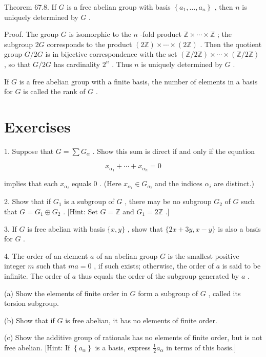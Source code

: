 \documentclass[10pt]{article}
\begin{document}
Theorem 67.8. If \(G\) is a free abelian group with basis \(\left\{  {{a}_{1},\ldots ,{a}_{n}}\right\}\) , then \(n\) is uniquely determined by \(G\) .

Proof. The group \(G\) is isomorphic to the \(n\) -fold product \(\mathbb{Z} \times  \cdots  \times  \mathbb{Z}\) ; the subgroup \({2G}\) corresponds to the product \(\left( {2\mathbb{Z}}\right)  \times  \cdots  \times  \left( {2\mathbb{Z}}\right)\) . Then the quotient group \(G/{2G}\) is in bijective correspondence with the set \(\left( {\mathbb{Z}/2\mathbb{Z}}\right)  \times  \cdots  \times  \left( {\mathbb{Z}/2\mathbb{Z}}\right)\) , so that \(G/{2G}\) has cardinality \({2}^{n}\) . Thus \(n\) is uniquely determined by \(G\) .

If \(G\) is a free abelian group with a finite basis, the number of elements in a basis for \(G\) is called the rank of \(G\) .

\section*{Exercises}

1. Suppose that \(G = \sum {G}_{\alpha }\) . Show this sum is direct if and only if the equation

\[
{x}_{{\alpha }_{1}} + \cdots  + {x}_{{\alpha }_{n}} = 0
\]

implies that each \({x}_{{\alpha }_{i}}\) equals 0 . (Here \({x}_{{\alpha }_{i}} \in  {G}_{{\alpha }_{i}}\) and the indices \({\alpha }_{i}\) are distinct.)

2. Show that if \({G}_{1}\) is a subgroup of \(G\) , there may be no subgroup \({G}_{2}\) of \(G\) such that \(G = {G}_{1} \oplus  {G}_{2}\) . [Hint: Set \(G = \mathbb{Z}\) and \({G}_{1} = 2\mathbb{Z}\) .]

3. If \(G\) is free abelian with basis \(\{ x,y\}\) , show that \(\{ {2x} + {3y},x - y\}\) is also a basis for \(G\) .

4. The order of an element \(a\) of an abelian group \(G\) is the smallest positive integer \(m\) such that \({ma} = 0\) , if such exists; otherwise, the order of \(a\) is said to be infinite. The order of \(a\) thus equals the order of the subgroup generated by \(a\) .

(a) Show the elements of finite order in \(G\) form a subgroup of \(G\) , called its torsion subgroup.

(b) Show that if \(G\) is free abelian, it has no elements of finite order.

(c) Show the additive group of rationals has no elements of finite order, but is not free abelian. [Hint: If \(\left\{  {a}_{\alpha }\right\}\) is a basis, express \(\frac{1}{2}{a}_{\alpha }\) in terms of this basis.]
\end{document}
